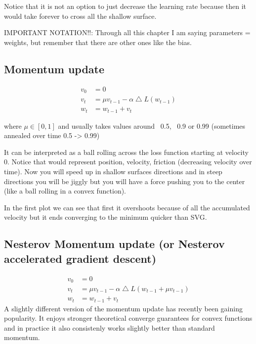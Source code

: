 Notice that it is not an option to just decrease the learning rate because then it would take forever to cross all the shallow surface.

IMPORTANT NOTATION!!: Through all this chapter I am saying parameters = weights, but remember that there are other ones like the bias.

\subsection*{Momentum update}
\begin{equation}
\begin{aligned}
v_0 &= 0 \\
v_t &= \mu v_{t-1} - \alpha \bigtriangleup L(w_{t-1}) \\
w_t &= w_{t-1} + v_t
\end{aligned}
\end{equation}

where $\mu \in [0,1]$ and usually takes values around ~0.5, ~0.9 or 0.99 (sometimes annealed over time 0.5 -> 0.99)

It can be interpreted as a ball rolling across the loss function starting at velocity 0. Notice that  would represent position,  velocity,  friction (decreasing velocity over time). Now you will speed up in shallow surfaces directions and in steep directions you will be jiggly but you will have a force pushing you to the center (like a ball rolling in a convex function).


In the first plot we can see that first it overshoots because of all the accumulated velocity but it ends converging to the minimum quicker than SVG.

\subsection*{Nesterov Momentum update (or Nesterov accelerated gradient descent) }
\begin{equation}
\begin{aligned}
v_0 &= 0 \\
v_t &= \mu v_{t-1} - \alpha \bigtriangleup L(w_{t-1} + \mu v_{t-1}) \\
w_t &= w_{t-1} + v_t
\end{aligned}
\end{equation}
A slightly different version of the momentum update has recently been gaining popularity. It enjoys stronger theoretical converge guarantees for convex functions and in practice it also consistenly works slightly better than standard momentum.

